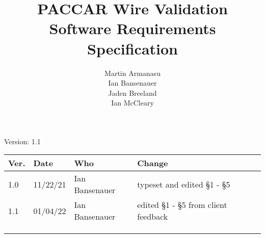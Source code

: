 \documentclass[letterpaper,12pt]{article}
\title{PACCAR Wire Validation\\Software Requirements Specification}
\author{Martin Armanasu\\Ian Bansenauer\\Jaden Breeland\\Ian McCleary}
\begin{document}
\maketitle

\begin{center}
  Version: 1.1
\end{center}

\vfill
\begin{tabularx}{\textwidth}{|l|l|l|X|}\hline
Ver. & Date & Who & Change \\\hline
 1.0 & 11/22/21   & Ian Bansenauer & typeset and edited \S 1 - \S5 \\\hline
 1.1 & 01/04/22   & Ian Bansenauer & edited \S 1 - \S5 from client feedback \\\hline
     &      &     &        \\\hline
     &      &     &        \\\hline
     &      &     &        \\\hline
\end{tabularx}

\newpage







\appendix 



\end{document}
